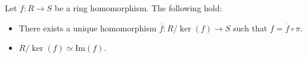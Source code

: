 \documentclass [12pt] {article}
\newenvironment{theorem}[1]{\begin{tcolorbox}[title={Theorem #1},colback=green!5!white,colframe=black!75!green]}{\end{tcolorbox}}
\renewcommand{\Im}{\text{Im}}
\begin{document}
\newpage
\begin{theorem}{(First Isomorphism Theorem)}
    \label{thm:isothm}
    Let $f : R \to S$ be a ring homomorphism. The following hold:
    \begin{itemize}[label=$\to$, leftmargin=*, itemsep=0em]
        \item There exists a unique homomorphism $\overline{f} : R/\ker(f) \to S$ such that 
            $f = \overline{f} \circ \pi$.
        \item $R/\ker(f) \simeq \Im(f)$.
    \end{itemize}
    \begin{center}
    \end{center}
\end{theorem}
\end{document}
